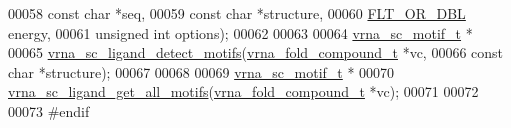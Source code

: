 \begin{DoxyCode}
00058                      \textcolor{keyword}{const} \textcolor{keywordtype}{char}           *seq,
00059                      \textcolor{keyword}{const} \textcolor{keywordtype}{char}           *structure,
00060                      \mbox{\hyperlink{group__data__structures_ga31125aeace516926bf7f251f759b6126}{FLT\_OR\_DBL}}           energy,
00061                      \textcolor{keywordtype}{unsigned} \textcolor{keywordtype}{int}         options);
00062 
00063 
00064 \mbox{\hyperlink{structvrna__sc__motif__s}{vrna\_sc\_motif\_t}} *
00065 \mbox{\hyperlink{constraints__ligand_8h_a43b6e725dd1f52b407e52a7dd1150987}{vrna\_sc\_ligand\_detect\_motifs}}(\mbox{\hyperlink{group__fold__compound_structvrna__fc__s}{vrna\_fold\_compound\_t}} *vc,
00066                              \textcolor{keyword}{const} \textcolor{keywordtype}{char}           *structure);
00067 
00068 
00069 \mbox{\hyperlink{structvrna__sc__motif__s}{vrna\_sc\_motif\_t}} *
00070 \mbox{\hyperlink{constraints__ligand_8h_a7dfe1352f53d8dd16a742b6daa5dc7be}{vrna\_sc\_ligand\_get\_all\_motifs}}(\mbox{\hyperlink{group__fold__compound_structvrna__fc__s}{vrna\_fold\_compound\_t}} *vc);
00071 
00072 
00073 \textcolor{preprocessor}{#endif}
\end{DoxyCode}
